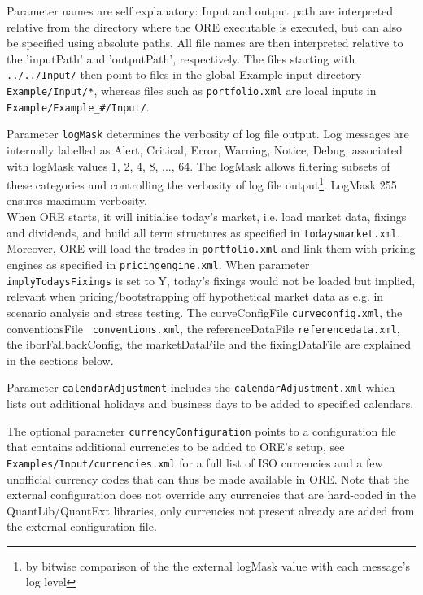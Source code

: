 \documentclass[12pt, a4paper]{article}
\begin{document}
{Parameter names are self explanatory: Input and output path are interpreted relative from the directory where the ORE
executable is executed, but can also be specified using absolute paths. All file names are then interpreted relative to the
'inputPath' and 'outputPath', respectively. The files starting with {\tt ../../Input/} then point to files in the global
Example input directory {\tt Example/Input/*}, whereas files such as {\tt portfolio.xml} are local inputs in {\tt 
Example/Example\_\#/Input/}. 

Parameter {\tt logMask} determines the verbosity of log file output. Log messages are 
internally labelled as Alert, Critical, Error, Warning, Notice, Debug, associated with logMask values 1, 2, 4, 8, ..., 64. 
The logMask allows filtering subsets of these categories and controlling the verbosity of log file output\footnote{by bitwise comparison of the the external logMask value with each message's log level}. LogMask 255 ensures maximum verbosity. \\

When ORE starts, it will initialise today's market, i.e. load market data, fixings and dividends, and build all term
structures as specified in {\tt todaysmarket.xml}.  Moreover, ORE will load the trades in {\tt portfolio.xml} and link
them with pricing engines as specified in {\tt pricingengine.xml}. When parameter {\tt implyTodaysFixings} is set to Y,
today's fixings would not be loaded but implied, relevant when pricing/bootstrapping off hypothetical market data as
e.g. in scenario analysis and stress testing. The curveConfigFile {\tt curveconfig.xml}, the conventionsFile {\tt
  conventions.xml}, the referenceDataFile {\tt referencedata.xml}, the iborFallbackConfig, the marketDataFile and the
fixingDataFile are explained in the sections below.

\medskip Parameter {\tt calendarAdjustment} includes the {\tt calendarAdjustment.xml} which lists out additional holidays and
business days to be added to specified calendars.

\medskip The optional parameter {\tt currencyConfiguration} points to a configuration file that contains additional currencies
to be added to ORE's setup, see {\tt Examples/Input/currencies.xml} for a full list of ISO currencies and a few unofficial currency
codes that can thus be made available in ORE. Note that the external configuration does not override any currencies that are
hard-coded in the QuantLib/QuantExt libraries, only currencies not present already are added from the external configuration file.

}
\end{document}
